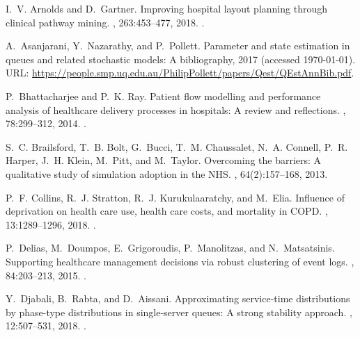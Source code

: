 \documentclass[11pt]{article}
\begin{document}
\begin{thebibliography}{10}

I.~V. Arnolds and D.~Gartner.
\newblock Improving hospital layout planning through clinical pathway mining.
, 263:453--477, 2018.
\newblock \href {https://doi.org/10.1007/s10479-017-2485-4}
  {}.

A.~Asanjarani, Y.~Nazarathy, and P.~Pollett.
\newblock Parameter and state estimation in queues and related stochastic
  models: A bibliography, 2017 (accessed \today).
\newblock URL:
  \url{https://people.smp.uq.edu.au/PhilipPollett/papers/Qest/QEstAnnBib.pdf}.

P.~Bhattacharjee and P.~K. Ray.
\newblock Patient flow modelling and performance analysis of healthcare
  delivery processes in hospitals: A review and reflections.
, 78:299--312, 2014.
\newblock \href {https://doi.org/10.1016/j.cie.2014.04.016}
  {}.

S.~C. Brailsford, T.~B. Bolt, G.~Bucci, T.~M. Chaussalet, N.~A. Connell, P.~R.
  Harper, J.~H. Klein, M.~Pitt, and M.~Taylor.
\newblock Overcoming the barriers: A qualitative study of simulation adoption
  in the {NHS}.
, 64(2):157--168,
  2013.

P.~F. Collins, R.~J. Stratton, R.~J. Kurukulaaratchy, and M.~Elia.
\newblock Influence of deprivation on health care use, health care costs, and
  mortality in {COPD}.
,
  13:1289--1296, 2018.
\newblock \href {https://doi.org/10.2147/COPD.S157594}
  {}.

P.~Delias, M.~Doumpos, E.~Grigoroudis, P.~Manolitzas, and N.~Matsatsinis.
\newblock Supporting healthcare management decisions via robust clustering of
  event logs.
, 84:203--213, 2015.
\newblock \href {https://doi.org/10.1016/j.knosys.2015.04.012}
  {}.

Y.~Djabali, B.~Rabta, and D.~Aissani.
\newblock Approximating service-time distributions by phase-type distributions
  in single-server queues: A strong stability approach.
,
  12:507--531, 2018.
\newblock \href {https://doi.org/10.1504/IJMOR.2018.10005095}
  {}.


\end{thebibliography}
\end{document}
